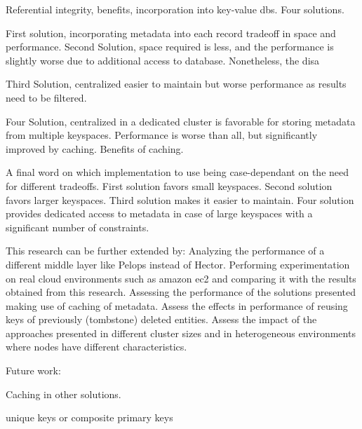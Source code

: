 Referential integrity, benefits, incorporation into key-value dbs. Four
solutions.
	
First solution, incorporating metadata into each record tradeoff in space and
performance. Second Solution, space required is less, and the performance is
slightly worse due to additional access to database. Nonetheless, the disa
	
Third Solution, centralized easier to maintain but worse performance as  results
need to be filtered.
	
Four Solution, centralized in a dedicated cluster is favorable for storing
metadata from multiple keyspaces. Performance is worse than all, but
significantly improved by caching. Benefits of caching.
	
A final word on which implementation to use being case-dependant on the need for
different tradeoffs. First solution favors small keyspaces. Second solution
favors larger keyspaces. Third solution makes it easier to maintain. Four
solution provides dedicated access to metadata in case of large keyspaces with a
significant number of constraints.
	
This research can be further extended by:
Analyzing the performance of a different middle layer like Pelops instead of
Hector.
Performing experimentation on real cloud environments such as amazon ec2 and
comparing it with the results obtained from this research.
Assessing the performance of the solutions presented making use of caching of
metadata.
Assess the effects in performance of reusing keys of previously (tombstone)
deleted entities.
Assess the impact of the approaches presented in different cluster sizes and in
heterogeneous environments where nodes have different characteristics.
	
	
	
	
	
	
	
	
Future work:
	
Caching in other solutions.
		
unique keys or composite primary keys
	
	
